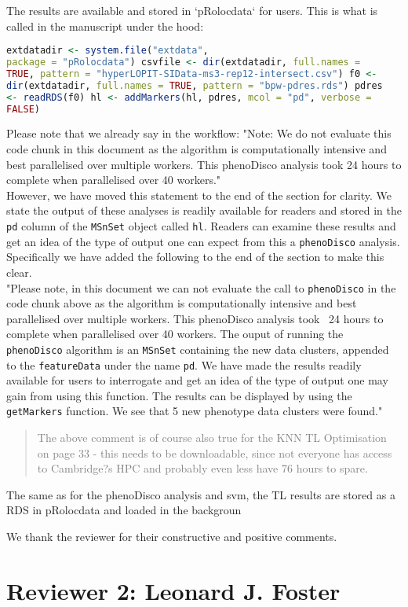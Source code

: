 \documentclass[11pt]{article}
\begin{document}
The results are available and stored in `pRolocdata` for users. This
is what is called in the manuscript under the hood:

\begin{lstlisting}[language=R] extdatadir <- system.file("extdata",
package = "pRolocdata") csvfile <- dir(extdatadir, full.names =
TRUE, pattern = "hyperLOPIT-SIData-ms3-rep12-intersect.csv") f0 <-
dir(extdatadir, full.names = TRUE, pattern = "bpw-pdres.rds") pdres
<- readRDS(f0) hl <- addMarkers(hl, pdres, mcol = "pd", verbose =
FALSE) \end{lstlisting}

Please note that we already say in the workflow: "Note: We do not
evaluate this code chunk in this document as the algorithm is
computationally intensive and best parallelised over multiple
workers. This phenoDisco analysis took 24 hours to complete when
parallelised over 40 workers." \newline \\ However, we have moved
this statement to the end of the section for clarity. We state the
output of these analyses is readily available for readers and stored
in the \texttt{pd} column of the \texttt{MSnSet} object called
\texttt{hl}. Readers can examine these results and get an idea of
the type of output one can expect from this a \texttt{phenoDisco}
analysis.  \newline \\ Specifically we have added the following to
the end of the section to make this clear.  \newline \\ "Please
note, in this document we can not evaluate the call to
\texttt{phenoDisco} in the code chunk above as the algorithm is
computationally intensive and best parallelised over multiple
workers. This phenoDisco analysis took ~24 hours to complete when
parallelised over 40 workers.  The ouput of running the
\texttt{phenoDisco} algorithm is an \texttt{MSnSet} containing the
new data clusters, appended to the \texttt{featureData} under the
name \texttt{pd}. We have made the results readily available for
users to interrogate and get an idea of the type of output one may
gain from using this function. The results can be displayed by using
the \texttt{getMarkers} function. We see that 5 new phenotype data
clusters were found."


\begin{quote}  \textcolor{gray}{ The above comment is of course also
true for the KNN TL Optimisation on page 33 - this needs to be
downloadable, since not everyone has access to Cambridge?s HPC and
probably even less have 76 hours to spare.} \end{quote}

The same as for the phenoDisco analysis and svm, the TL results are
stored as a RDS in pRolocdata and loaded in the backgroun


We thank the reviewer for their constructive and positive comments.

\section*{Reviewer 2: Leonard J. Foster}

\begin{quote}\textcolor{gray}{ } \end{quote}
\end{document}
